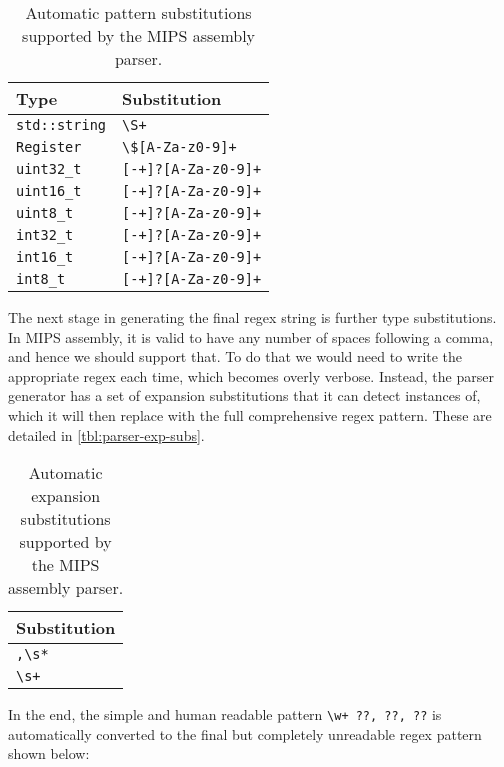 \begin{table}[H] 
    \centering
    \begin{tabular}{l|l}
        \toprule
        Type & Substitution \\
        \midrule
        \texttt{std::string} & \texttt{\textbackslash S+} \\
        \texttt{Register} & \texttt{\textbackslash \$[A-Za-z0-9]+} \\
        \texttt{uint32\_t} & \texttt{[-+]?[A-Za-z0-9]+} \\
        \texttt{uint16\_t} & \texttt{[-+]?[A-Za-z0-9]+} \\
        \texttt{uint8\_t} & \texttt{[-+]?[A-Za-z0-9]+} \\
        \texttt{int32\_t} & \texttt{[-+]?[A-Za-z0-9]+} \\
        \texttt{int16\_t} & \texttt{[-+]?[A-Za-z0-9]+} \\
        \texttt{int8\_t} & \texttt{[-+]?[A-Za-z0-9]+} \\
        \bottomrule
    \end{tabular}
    \caption{Automatic pattern substitutions supported by the MIPS assembly parser.}
    \label{tbl:parser-type-subs}
\end{table}

The next stage in generating the final regex string is further type substitutions. In MIPS assembly, it is valid to have any number of spaces following a comma, and hence we should support that. To do that we would need to write the appropriate regex each time, which becomes overly verbose. Instead, the parser generator has a set of expansion substitutions that it can detect instances of, which it will then replace with the full comprehensive regex pattern. These are detailed in \autoref{tbl:parser-exp-subs}.

\begin{table}[H] 
    \centering
    \begin{tabular}{l}
        \toprule
        Substitution \\
        \midrule
        \texttt{,\textbackslash s*} \\
        \texttt{\textbackslash s+} \\
        \bottomrule
    \end{tabular}
    \caption{Automatic expansion substitutions supported by the MIPS assembly parser.}
    \label{tbl:parser-exp-subs}
\end{table}

In the end, the simple and human readable pattern \texttt{\textbackslash w+ ??, ??, ??} is automatically converted to the final but completely unreadable regex pattern shown below:

